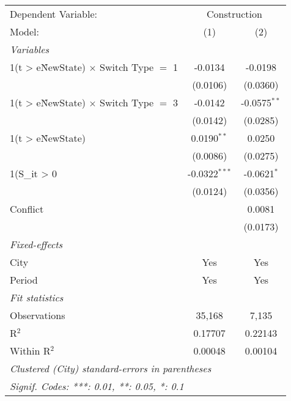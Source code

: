 \begingroup
\centering
\begin{tabular}{lcc}
   \tabularnewline \midrule \midrule
   Dependent Variable: & \multicolumn{2}{c}{Construction}\\
   Model:                                          & (1)             & (2)\\  
   \midrule
   \emph{Variables}\\
   1(t > e\^NewState) $\times$ Switch Type $=$ 1   & -0.0134         & -0.0198\\   
                                                   & (0.0106)        & (0.0360)\\   
   1(t > e\^NewState) $\times$ Switch Type $=$ 3   & -0.0142         & -0.0575$^{**}$\\   
                                                   & (0.0142)        & (0.0285)\\   
   1(t > e\^NewState)                              & 0.0190$^{**}$   & 0.0250\\   
                                                   & (0.0086)        & (0.0275)\\   
   1(S\_{it} > 0                                   & -0.0322$^{***}$ & -0.0621$^{*}$\\   
                                                   & (0.0124)        & (0.0356)\\   
   Conflict                                        &                 & 0.0081\\   
                                                   &                 & (0.0173)\\   
   \midrule
   \emph{Fixed-effects}\\
   City                                            & Yes             & Yes\\  
   Period                                          & Yes             & Yes\\  
   \midrule
   \emph{Fit statistics}\\
   Observations                                    & 35,168          & 7,135\\  
   R$^2$                                           & 0.17707         & 0.22143\\  
   Within R$^2$                                    & 0.00048         & 0.00104\\  
   \midrule \midrule
   \multicolumn{3}{l}{\emph{Clustered (City) standard-errors in parentheses}}\\
   \multicolumn{3}{l}{\emph{Signif. Codes: ***: 0.01, **: 0.05, *: 0.1}}\\
\end{tabular}
\par\endgroup
